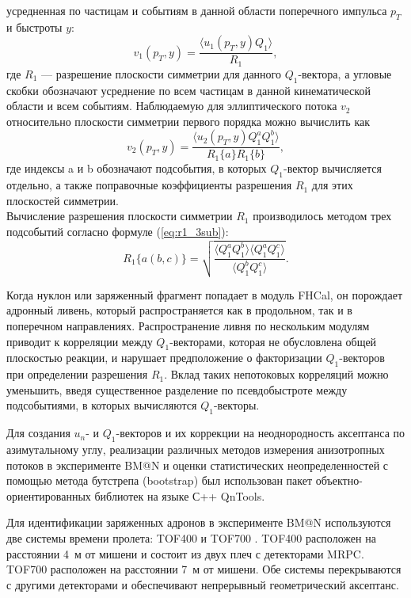 усредненная по частицам и событиям в данной области поперечного импульса $p_T$ и быстроты $y$:
\begin{equation}
  v_1(p_T, y) = \frac{ \langle u_1(p_T, y) Q_1 \rangle }{ R_1 },
\end{equation}
где $R_1$ --- разрешение плоскости симметрии для данного $Q_1$-вектора, а угловые скобки обозначают усреднение по всем частицам в данной кинематической области и всем событиям.
Наблюдаемую для эллиптического потока $v_2$ относительно плоскости симметрии первого порядка можно вычислить как
\begin{equation}
v_2(p_T,y) = \frac{\langle u_2(p_T,y) Q_1^a Q_1^b \rangle}{R_1\{a\} R_1\{b\}},
\label{eq:v1_formula}
\end{equation}
где индексы a и b обозначают подсобытия, в которых $Q_1$-вектор вычисляется отдельно, а также поправочные коэффициенты разрешения $R_1$ для этих плоскостей симметрии.\\
Вычисление разрешения плоскости симметрии $R_1$  производилось методом трех подсобытий согласно формуле (\ref{eq:r1_3sub}):
\begin{equation}
    R_1\{a(b,c)\}  =  \sqrt { \frac{ \langle Q_1^a Q_1^b \rangle \langle Q_1^a Q_1^c \rangle }{ \langle Q_1^b Q_1^c \rangle} }.
\end{equation}

Когда нуклон или заряженный фрагмент попадает в модуль FHCal, он порождает адронный ливень, который распространяется 
как в продольном, так и в поперечном направлениях. 
Распространение ливня по нескольким модулям приводит к корреляции между $Q_1$-векторами,
которая не обусловлена общей плоскостью реакции, и нарушает предположение о факторизации $Q_1$-векторов при определении  разрешения $R_1$.
Вклад таких непотоковых корреляций можно уменьшить, введя существенное разделение по псевдобыстроте  между подсобытиями, в которых вычисляются $Q_1$-векторы.

Для создания $u_n$- и $Q_1$-векторов и их коррекции на неоднородность аксептанса по азимутальному углу, реализации различных методов измерения анизотропных потоков в эксперименте BM@N
и оценки статистических неопределенностей с помощью метода бутстрепа (bootstrap) был использован пакет объектно-ориентированных 
библиотек на языке С++ QnTools.  

Для идентификации заряженных адронов в эксперименте BM@N используются две системы времени пролета: TOF400 и TOF700 \cite{Afanasiev:2023opv}. 
TOF400 расположен на расстоянии 4~м от мишени и состоит из двух плеч с детекторами MRPC. 
TOF700 расположен на расстоянии 7~м от мишени.
Обе  системы перекрываются с другими детекторами и обеспечивают непрерывный геометрический аксептанс.


